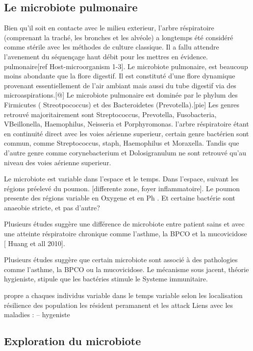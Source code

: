 \documentclass[12pt,a4paper]{article}
\begin{document}
\subsection{Le microbiote pulmonaire}

Bien qu’il soit en contacte avec le milieu exterieur, l’arbre réspiratoire (comprenant la traché, les bronches et les alvéole) a longtemps été considéré comme stérile avec les méthodes de culture classique. Il a fallu attendre l’avenement du séquençage haut débit pour les mettres en évidence. pulmonaire[ref Host-microorganism 1-3].
Le microbiote pulmonaire, est beaucoup moins abondante que la flore digestif. Il est constituté d’une flore dynamique provenant essentiellement de l’air ambiant mais aussi du tube digestif via des microaspirations.[@]
Le microbiote pulmonaire est dominée par le phylum des Firmicutes ( Streotpococcus) et des Bacteroidetes (Prevotella).[pie] Les genres retrouvé majoritairement sont Streptococcus, Prevotella, Fusobacteria, VBeillonella, Haemophilus, Neisseria et Porphyromonas.
l’arbre réspiratoire étant en continuité direct avec les voies aérienne superieur, certain genre bactérien sont commun, comme Streptococcus, staph, Haemophilus et Moraxella. Tandis que d’autre genre comme corynebacterium et Dolosigranulum ne sont retrouvé qu’au niveau des voies aérienne superieur.

Le microbiote est variable dans l’espace et le temps.
Dans l’espace, suivant les régions préelevé du poumon. [differente zone, foyer inflammatoire]. Le poumon presente des régions variable en Oxygene et en Ph . Et certaine bactérie sont anaeobie stricte, et pas d’autre?

Plusieurs études suggère une différence de microbiote entre patient sains et avec une atteinte réspiratoire chronique comme l’asthme, la BPCO et la mucovicidose [ Huang et all 2010].

Plusieurs études suggère que certain microbiote sont associé à des pathologies comme l’asthme, la BPCO ou la mucovicidose. Le mécanisme sous jacent, théorie hygieniste, stipule que les bactéries stimule le Systeme immunitaire.

propre a chaques individus
variable dans le temps
variable selon les localisation
résilience des population
les résident peramanent et les attack
Liens avec les maladies :
– hygeniste

\subsection{Exploration du microbiote}
\end{document}
